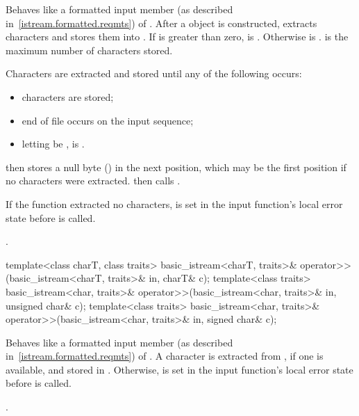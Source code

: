 \begin{itemdescr}
\pnum
\effects
Behaves like a formatted input member (as described in~\ref{istream.formatted.reqmts})
of .
After a
object is constructed,
extracts characters and stores them into
.
If
is greater than zero,  is
.
Otherwise  is .
 is the maximum number of characters stored.

\pnum
Characters are extracted and stored until any of the following occurs:
\begin{itemize}
\item {} characters are stored;
\item end of file occurs on the input sequence;
\item letting  be ,
 is .
\end{itemize}

\pnum
{}
then stores a null byte
()
in the next position, which may be the first position if no characters
were extracted.
then calls
.

\pnum
If the function extracted no characters,
 is set in the input function's local error state
before  is called.

\pnum
\returns
{}.
\end{itemdescr}

%
\begin{itemdecl}
template<class charT, class traits>
  basic_istream<charT, traits>& operator>>(basic_istream<charT, traits>& in, charT& c);
template<class traits>
  basic_istream<char, traits>& operator>>(basic_istream<char, traits>& in, unsigned char& c);
template<class traits>
  basic_istream<char, traits>& operator>>(basic_istream<char, traits>& in, signed char& c);
\end{itemdecl}

\begin{itemdescr}
\pnum
\effects
Behaves like a formatted input member (as described in~\ref{istream.formatted.reqmts})
of .
A character is extracted from , if one is available, and stored in .
Otherwise,
 is set in the input function's local error state
before  is called.

\pnum
\returns
{}.
\end{itemdescr}

